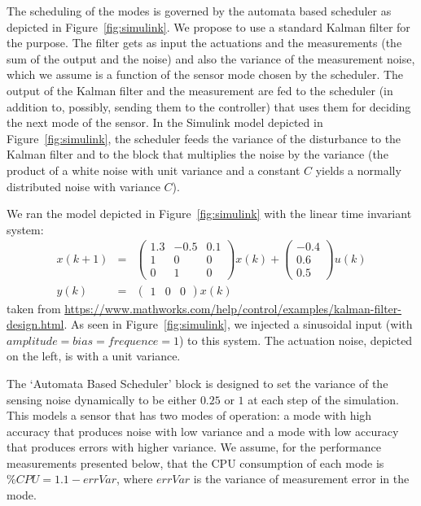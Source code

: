 \documentclass{sig-alternate-ipsn13}
\begin{document}
The scheduling of the modes is governed by the automata based scheduler as depicted in Figure~\ref{fig:simulink}. We propose to use a standard Kalman filter for the purpose. The filter gets as input the actuations and the measurements (the sum of the output and the noise) and also the variance of the measurement noise, which we assume is a function of the sensor mode chosen by the scheduler. The output of the Kalman filter and the measurement are fed to the scheduler (in addition to, possibly, sending them to the controller) that uses them for deciding the next mode of the sensor. In the Simulink model depicted in Figure~\ref{fig:simulink}, the scheduler feeds the variance of the disturbance to the Kalman filter and to the block that multiplies the noise by the variance (the product of a white noise with unit variance and a constant $C$ yields a normally distributed noise with variance $C$).

We ran the model depicted in Figure~\ref{fig:simulink} with the linear time invariant system:
\begin{eqnarray*}
x(k+1) &=& \begin{pmatrix}
	1.3  & -0.5  & 0.1 \\
	1    & 0     & 0 \\
	0    & 1     & 0
\end{pmatrix}x(k)+ 
\begin{pmatrix}
-0.4 \\
0.6\\
0.5\end{pmatrix} u(k) \\
y(k)&=& \begin{pmatrix}1 & 0 &0\end{pmatrix}x(k)
\end{eqnarray*}
taken from \url{https://www.mathworks.com/help/control/examples/kalman-filter-design.html}. As seen in Figure~\ref{fig:simulink}, we injected a sinusoidal input (with $amplitude=bias=frequence=1$) to this system. 
The actuation noise, depicted on the left, is with a unit variance. 

The `Automata Based Scheduler' block is designed to set the variance of the sensing noise dynamically to be either $0.25$ or $1$ at each step of the simulation. This models a sensor that has two modes of operation: a mode with high accuracy that produces noise with low variance and a mode with low accuracy that produces errors with higher variance. We assume, for the performance measurements presented below, that the CPU consumption of each mode is $\%CPU=1.1-errVar$, where $errVar$ is the variance of measurement error in the mode.
\end{document}
